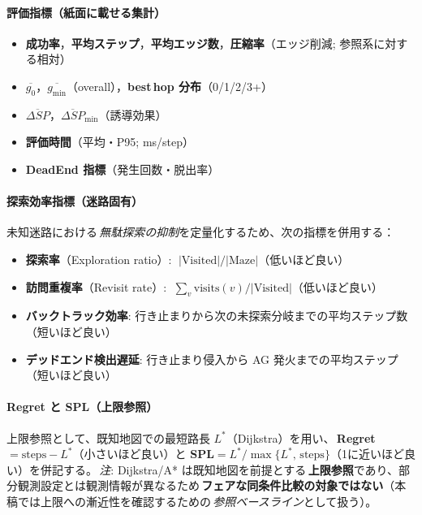 \documentclass[ja=standard,xelatex]{bxjsarticle}
\begin{document}
\paragraph{評価指標（紙面に載せる集計）}
\begin{itemize}
  \item \textbf{成功率}，\textbf{平均ステップ}，\textbf{平均エッジ数}，\textbf{圧縮率}（エッジ削減; 参照系に対する相対）
  \item \textbf{$\overline{g_0}$}，\textbf{$\overline{g_{\min}}$}（overall），\textbf{best\,hop 分布}（0/1/2/3+）
  \item \textbf{$\overline{\Delta SP}$}，\textbf{$\overline{\Delta SP}_{\min}$}（誘導効果）
  \item \textbf{評価時間}（平均・P95; ms/step）
  \item \textbf{DeadEnd 指標}（発生回数・脱出率）
\end{itemize}

\paragraph{探索効率指標（迷路固有）}
未知迷路における\,\emph{無駄探索の抑制}を定量化するため、次の指標を併用する：
\begin{itemize}
  \item \textbf{探索率}（Exploration ratio）: $\;\lvert\mathrm{Visited}\rvert/\lvert\mathrm{Maze}\rvert$（低いほど良い）
  \item \textbf{訪問重複率}（Revisit rate）: $\;\sum_v \mathrm{visits}(v)/\lvert\mathrm{Visited}\rvert$（低いほど良い）
  \item \textbf{バックトラック効率}: 行き止まりから次の未探索分岐までの平均ステップ数（短いほど良い）
  \item \textbf{デッドエンド検出遅延}: 行き止まり侵入から AG 発火までの平均ステップ（短いほど良い）
\end{itemize}

\paragraph{Regret と SPL（上限参照）}
上限参照として、既知地図での最短路長 $L^*$（Dijkstra）を用い、\,\textbf{Regret}$=\mathrm{steps}-L^*$（小さいほど良い）と \textbf{SPL}$=L^*/\max\{L^*,\,\mathrm{steps}\}$（1に近いほど良い）を併記する。\,\emph{注}: Dijkstra/A* は既知地図を前提とする\,\textbf{上限参照}であり、部分観測設定とは観測情報が異なるため\,\textbf{フェアな同条件比較の対象ではない}（本稿では上限への漸近性を確認するための\,\emph{参照ベースライン}として扱う）。
\end{document}
